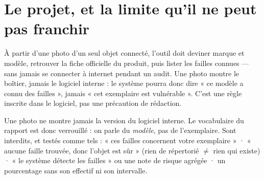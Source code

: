 \documentclass[10pt,a4paper]{article}
\newcommand{\TODO}{\textcolor{todo}{\faHourglassHalf}}
\begin{document}
\section{Le projet, et la limite qu'il ne peut pas franchir}
À partir d'une photo d'un seul objet connecté, l'outil doit deviner marque et modèle, retrouver la
fiche officielle du produit, puis lister les failles connues — sans jamais se connecter à internet
pendant un audit. Une photo montre le boîtier, jamais le logiciel interne : le système pourra donc
dire « ce modèle a connu des failles », jamais « cet exemplaire est vulnérable ». C'est une règle
inscrite dans le logiciel, pas une précaution de rédaction.

\begin{center}
\label{fig:chaine}
\end{center}

\begin{limite}
Une photo ne montre jamais la version du logiciel interne. Le vocabulaire du rapport est donc
verrouillé : on parle du \emph{modèle}, pas de l'exemplaire. Sont interdits, et testés comme tels :
« ces failles concernent votre exemplaire » · « aucune faille trouvée, donc l'objet est sûr » (rien
de répertorié $\neq$ rien qui existe) · « le système détecte les failles » ou une note de risque
agrégée · un pourcentage sans son effectif ni son intervalle.
\end{limite}
\end{document}
